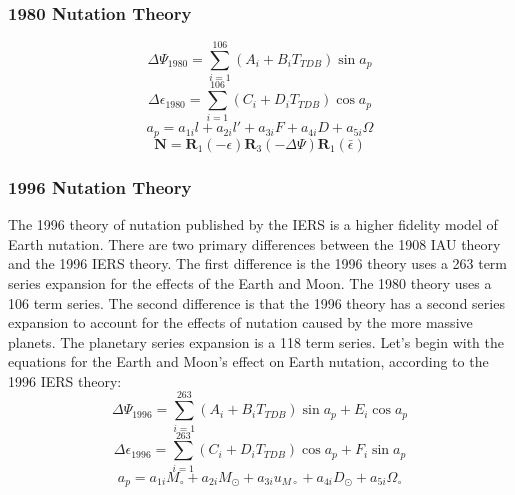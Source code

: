 \subsubsection{ 1980 Nutation Theory } 


\begin{equation}
     \Delta \Psi_{1980} = \sum_{i=1}^{106}\left( A_i + B_i T_{TDB}
     \right) \sin{a_p}
\end{equation}
%
\begin{equation}
     \Delta \epsilon_{1980} = \sum_{i=1}^{106}\left( C_i + D_i T_{TDB}
     \right) \cos{a_p}
\end{equation}
%
\begin{equation}
     a_p = a_{1i} l + a_{2i} l' + a_{3i} F+
     a_{4i} D + a_{5i}\Omega
\end{equation}
%
\begin{equation}
     \mathbf{N} = \mathbf{R}_1(-\epsilon) \mathbf{R}_3(-\Delta
     \Psi)\mathbf{R}_1(\bar \epsilon)
\end{equation}

\subsubsection{ 1996 Nutation Theory }

The 1996 theory of nutation published by the IERS is a higher
fidelity model of Earth nutation.  There are two primary differences
between the 1908 IAU theory and the 1996 IERS theory.  The first
difference is the 1996 theory uses a 263 term series expansion for
the effects of the Earth and Moon.  The 1980 theory uses a 106 term
series.  The second difference is that the 1996 theory has a second
series expansion to account for the effects of nutation caused by
the more massive planets.  The planetary series expansion is a 118
term series.  Let's begin with the equations for the Earth and
Moon's effect on Earth nutation, according to the 1996 IERS theory:
%
\begin{equation}
     \Delta \Psi_{1996} = \sum_{i=1}^{263}\left( A_i + B_i T_{TDB}
     \right) \sin{a_p} +
     E_i\cos{a_p}
\end{equation}
%
\begin{equation}
     \Delta \epsilon_{1996} = \sum_{i=1}^{263}\left( C_i + D_i T_{TDB}
     \right) \cos{a_p} + F_i\sin{a_p}
\end{equation}
%
\begin{equation}
     a_p = a_{1i} M_\circ + a_{2i} M_\odot + a_{3i}u_{M\circ} +
     a_{4i}D_{\odot} + a_{5i}\Omega_{\circ}
\end{equation}
%

